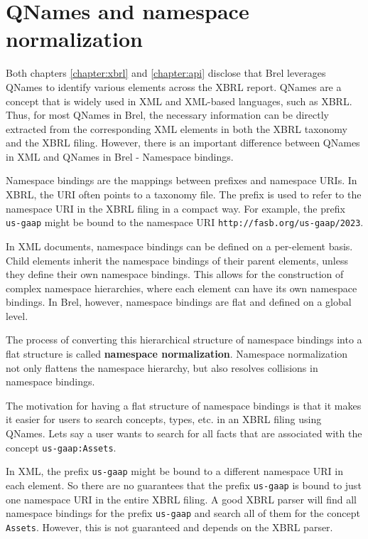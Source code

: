 
\section{QNames and namespace normalization}
\label{sec:qnames_implementation}

Both chapters \ref{chapter:xbrl} and \ref{chapter:api} disclose that Brel leverages QNames to identify various elements across the XBRL report.
QNames are a concept that is widely used in XML and XML-based languages, such as XBRL.
Thus, for most QNames in Brel, the necessary information can be directly extracted from the corresponding XML elements in both the XBRL taxonomy and the XBRL filing.
However, there is an important difference between QNames in XML and QNames in Brel - Namespace bindings.

Namespace bindings are the mappings between prefixes and namespace URIs.
In XBRL, the URI often points to a taxonomy file.
The prefix is used to refer to the namespace URI in the XBRL filing in a compact way.
For example, the prefix \texttt{us-gaap} might be bound to the namespace URI \texttt{http://fasb.org/us-gaap/2023}.

In XML documents, namespace bindings can be defined on a per-element basis. 
Child elements inherit the namespace bindings of their parent elements, unless they define their own namespace bindings. 
This allows for the construction of complex namespace hierarchies, where each element can have its own namespace bindings.
In Brel, however, namespace bindings are flat and defined on a global level.

The process of converting this hierarchical structure of namespace bindings into a flat structure is called \textbf{namespace normalization}.
Namespace normalization not only flattens the namespace hierarchy, but also resolves collisions in namespace bindings.

The motivation for having a flat structure of namespace bindings is that it makes it easier for users to search concepts, types, etc. in an XBRL filing using QNames.
Lets say a user wants to search for all facts that are associated with the concept \texttt{us-gaap:Assets}.

In XML, the prefix \texttt{us-gaap} might be bound to a different namespace URI in each element.
So there are no guarantees that the prefix \texttt{us-gaap} is bound to just one namespace URI in the entire XBRL filing.
A good XBRL parser will find all namespace bindings for the prefix \texttt{us-gaap} and search all of them for the concept \texttt{Assets}.
However, this is not guaranteed and depends on the XBRL parser.

